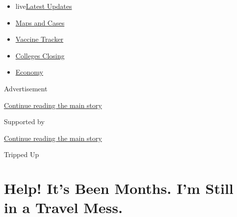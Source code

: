 \begin{itemize}
\tightlist
\item
  live\href{https://www.nytimes3xbfgragh.onion/2020/08/21/world/covid-19-coronavirus.html?name=styln-coronavirus-national\&region=TOP_BANNER\&variant=undefined\&block=storyline_menu_recirc\&action=click\&pgtype=Article\&impression_id=d1281ea0-e3b3-11ea-a68a-479821f8f864}{Latest
  Updates}
\item
  \href{https://www.nytimes3xbfgragh.onion/interactive/2020/us/coronavirus-us-cases.html?name=styln-coronavirus-national\&region=TOP_BANNER\&variant=undefined\&block=storyline_menu_recirc\&action=click\&pgtype=Article\&impression_id=d1281ea1-e3b3-11ea-a68a-479821f8f864}{Maps
  and Cases}
\item
  \href{https://www.nytimes3xbfgragh.onion/interactive/2020/science/coronavirus-vaccine-tracker.html?name=styln-coronavirus-national\&region=TOP_BANNER\&variant=undefined\&block=storyline_menu_recirc\&action=click\&pgtype=Article\&impression_id=d12845b0-e3b3-11ea-a68a-479821f8f864}{Vaccine
  Tracker}
\item
  \href{https://www.nytimes3xbfgragh.onion/2020/08/19/us/colleges-closing-covid.html?name=styln-coronavirus-national\&region=TOP_BANNER\&variant=undefined\&block=storyline_menu_recirc\&action=click\&pgtype=Article\&impression_id=d12845b1-e3b3-11ea-a68a-479821f8f864}{Colleges
  Closing}
\item
  \href{https://www.nytimes3xbfgragh.onion/live/2020/08/21/business/stock-market-today-coronavirus?name=styln-coronavirus-national\&region=TOP_BANNER\&variant=undefined\&block=storyline_menu_recirc\&action=click\&pgtype=Article\&impression_id=d12845b2-e3b3-11ea-a68a-479821f8f864}{Economy}
\end{itemize}

Advertisement

\protect\hyperlink{after-top}{Continue reading the main story}

Supported by

\protect\hyperlink{after-sponsor}{Continue reading the main story}

Tripped Up

\hypertarget{help-its-been-months-im-still-in-a-travel-mess}{%
\section{Help! It's Been Months. I'm Still in a Travel
Mess.}\label{help-its-been-months-im-still-in-a-travel-mess}}

